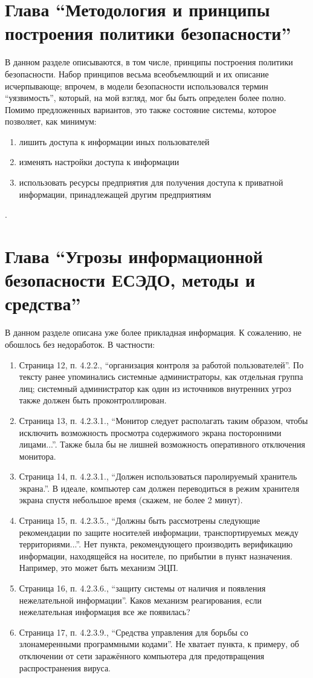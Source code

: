 \documentclass{article}
\begin{document}
\section{Глава ``Методология и принципы построения политики безопасности''}
В данном разделе описываются, в том числе, принципы построения политики безопасности. Набор принципов весьма всеобъемлющий и их описание исчерпывающе; впрочем, в модели безопасности использовался термин ``уязвимость'', который, на мой взгляд, мог бы быть определен более полно. Помимо предложенных вариантов, это также состояние системы, которое позволяет, как минимум:
\begin{enumerate}
    \item лишить доступа к информации иных пользователей
    \item изменять настройки доступа к информации
    \item использовать ресурсы предприятия для получения доступа к приватной информации, принадлежащей другим предприятиям
\end{enumerate}.

\section{Глава ``Угрозы информационной безопасности ЕСЭДО, методы и средства''}

В данном разделе описана уже более прикладная информация. К сожалению, не обошлось без недоработок. В частности:

\begin{enumerate}
    \item Страница 12, п. 4.2.2., ``организация контроля за работой пользователей''. По тексту ранее упоминались системные администраторы, как отдельная группа лиц; системный администратор как один из источников внутренних угроз также должен быть проконтроллирован.
    \item Страница 13, п. 4.2.3.1., ``Монитор следует располагать таким образом, чтобы исключить возможность просмотра содержимого экрана посторонними лицами...''. Также была бы не лишней возможность оперативного отключения монитора.
    \item Страница 14, п. 4.2.3.1., ``Должен использоваться паролируемый хранитель экрана.''. В идеале, компьютер сам должен переводиться в режим хранителя экрана спустя небольшое время (скажем, не более 2 минут).
    \item Страница 15, п. 4.2.3.5., ``Должны быть рассмотрены следующие рекомендации по защите носителей информации, транспортируемых между территориями...''. Нет пункта, рекомендующего производить верификацию информации, находящейся на носителе, по прибытии в пункт назначения. Например, это может быть механизм ЭЦП.
    \item Страница 16, п. 4.2.3.6., ``защиту системы от наличия и появления нежелательной информации''. Каков механизм реагирования, если нежелательная информация все же появилась?
    \item Страница 17, п. 4.2.3.9., ``Средства управления для борьбы со злонамеренными программными кодами''. Не хватает пункта, к примеру, об отключении от сети заражённого компьютера для предотвращения распространения вируса.
\end{enumerate}
\end{document}
